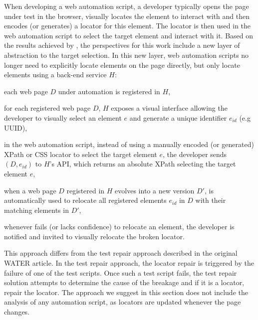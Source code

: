 When developing a web automation script, a developer typically opens the page under test in the browser, visually locates the element to interact with and then encodes (or generates) a locator for this element.
The locator is then used in the web automation script to select the target element and interact with it.
% 
Based on the results achieved by \erratum{}, the perspectives for this work include a new layer of abstraction to the target selection.
In this new layer, web automation scripts no longer need to explicitly locate elements on the page directly, but only locate elements using a back-end service $H$:
\begin{compactenum}
    \item each web page $D$ under automation is registered in $H$,
    \item for each registered web page $D$, $H$ exposes a visual interface
    allowing the developer to visually select an element $e$ and generate a
    unique identifier $e_{id}$ (e.g UUID),
    \item in the web automation script, instead of using a manually encoded (or generated) XPath or CSS locator to select the target element $e$, the developer sends $(D, e_{id})$ to $H$'s API, which returns an absolute XPath selecting the target element $e$,
    \item when a web page $D$ registered in $H$ evolves into a new version $D'$, \erratum{} is automatically used to relocate all registered elements $e_{id}$ in $D$ with their matching elements in $D'$,
    \item whenever \erratum{} fails (or lacks confidence) to relocate an element, the developer is notified and invited to visually relocate the broken locator.
\end{compactenum}

This approach differs from the test repair approach described in the original WATER article. 
In the test repair approach, the locator repair is triggered by the failure of one of the test scripts.
Once such a test script fails, the test repair solution attempts to determine the cause of the breakage and if it is a locator, repair the locator.
The approach we suggest in this section does not include the analysis of any automation script, as locators are updated whenever the page changes.


